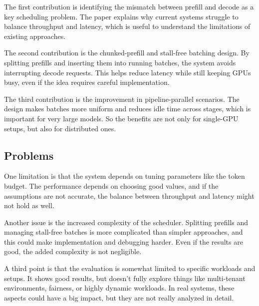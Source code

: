 \documentclass[a4paper, 12pt]{article}
\begin{document}
The first contribution is identifying the mismatch between prefill and decode as a key scheduling problem. The paper explains why current systems struggle to balance throughput and latency, which is useful to understand the limitations of existing approaches.

The second contribution is the chunked-prefill and stall-free batching design. By splitting prefills and inserting them into running batches, the system avoids interrupting decode requests. This helps reduce latency while still keeping GPUs busy, even if the idea requires careful implementation.

The third contribution is the improvement in pipeline-parallel scenarios. The design makes batches more uniform and reduces idle time across stages, which is important for very large models. So the benefits are not only for single-GPU setups, but also for distributed ones.

\subsection{Problems}

One limitation is that the system depends on tuning parameters like the token budget. The performance depends on choosing good values, and if the assumptions are not accurate, the balance between throughput and latency might not hold as well.

Another issue is the increased complexity of the scheduler. Splitting prefills and managing stall-free batches is more complicated than simpler approaches, and this could make implementation and debugging harder. Even if the results are good, the added complexity is not negligible.

A third point is that the evaluation is somewhat limited to specific workloads and setups. It shows good results, but doesn’t fully explore things like multi-tenant environments, fairness, or highly dynamic workloads. In real systems, these aspects could have a big impact, but they are not really analyzed in detail.
\end{document}
